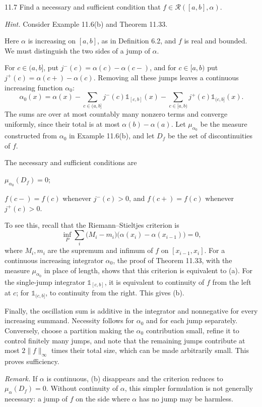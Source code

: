 \documentclass[11pt,oneside]{article}
\begin{document}
\begin{exercise}{11.7}
Find a necessary and sufficient condition that $f\in\mathcal R([a,b],\alpha)$.

\textit{Hint.} Consider Example 11.6(b) and Theorem 11.33.
\end{exercise}
\begin{solution}
Here $\alpha$ is increasing on $[a,b]$, as in Definition 6.2, and $f$ is real and bounded. We must distinguish the two sides of a jump of $\alpha$.

For $c\in(a,b]$, put $j^-(c)=\alpha(c)-\alpha(c-)$, and for $c\in[a,b)$ put $j^+(c)=\alpha(c+)-\alpha(c)$. Removing all these jumps leaves a continuous increasing function $\alpha_0$:
\[
 \alpha_0(x)=\alpha(x)
 -\sum_{c\in(a,b]}j^-(c)\mathds{1}_{[c,b]}(x)
 -\sum_{c\in[a,b)}j^+(c)\mathds{1}_{(c,b]}(x).
\]
The sums are over at most countably many nonzero terms and converge uniformly, since their total is at most $\alpha(b)-\alpha(a)$. Let $\mu_{\alpha_0}$ be the measure constructed from $\alpha_0$ in Example 11.6(b), and let $D_f$ be the set of discontinuities of $f$.

The necessary and sufficient conditions are
\begin{exercisesubparts}
\item $\mu_{\alpha_0}(D_f)=0$;
\item $f(c-)=f(c)$ whenever $j^-(c)>0$, and $f(c+)=f(c)$ whenever $j^+(c)>0$.
\end{exercisesubparts}
To see this, recall that the Riemann--Stieltjes criterion is
\[
 \inf_P\sum_i\bigl(M_i-m_i\bigr)
                   \bigl(\alpha(x_i)-\alpha(x_{i-1})\bigr)=0,
\]
where $M_i,m_i$ are the supremum and infimum of $f$ on $[x_{i-1},x_i]$. For a continuous increasing integrator $\alpha_0$, the proof of Theorem 11.33, with the measure $\mu_{\alpha_0}$ in place of length, shows that this criterion is equivalent to (a). For the single-jump integrator $\mathds{1}_{[c,b]}$, it is equivalent to continuity of $f$ from the left at $c$; for $\mathds{1}_{(c,b]}$, to continuity from the right. This gives (b).

Finally, the oscillation sum is additive in the integrator and nonnegative for every increasing summand. Necessity follows for $\alpha_0$ and for each jump separately. Conversely, choose a partition making the $\alpha_0$ contribution small, refine it to control finitely many jumps, and note that the remaining jumps contribute at most $2\|f\|_\infty$ times their total size, which can be made arbitrarily small. This proves sufficiency.

\textit{Remark.} If $\alpha$ is continuous, (b) disappears and the criterion reduces to $\mu_\alpha(D_f)=0$. Without continuity of $\alpha$, this simpler formulation is not generally necessary: a jump of $f$ on the side where $\alpha$ has no jump may be harmless.
\end{solution}
\end{document}
